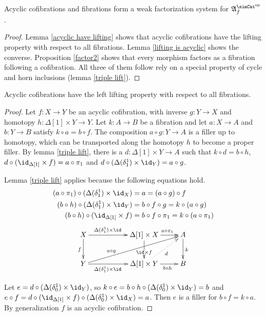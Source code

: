 \documentclass{tac}
\newcommand\hide[1]{}
\newcommand\dual{^{\mathrm{op}}}
\newcommand\s{^{\simCat\dual}}
\newcommand\of{:}
\newcommand\simplex\Delta
\newcommand\f{_f}
\newcommand\ambient{\mathfrak A}
\begin{document}
\begin{theorem} Acyclic cofibrations and fibrations form a weak factorization system for $\ambient\s\f$. \end{theorem}

\begin{proof} Lemma \ref{acyclic have lifting} shows that acyclic cofibrations have the lifting property with respect to all fibrations. Lemma \ref{lifting is acyclic} shows the converse. Proposition \ref{factor2} shows that every morphism factors as a fibration following a cofibration. All three of them follow rely on a special property of cycle and horn inclusions (lemma \ref{triple lift}).
\end{proof}

\hide{
to do: 
proof triple lift
proof that acyclic cofibrations have the required lifting properties

proof that every morphism with these lifting properties is an acyclic cofibration. 
proof factorization
}


\begin{lemma} Acyclic cofibrations have the left lifting property with respect to all fibrations. \label{acyclic have lifting}\end{lemma}

\begin{proof} Let $f\of X\to Y$ be an acyclic cofibration, with inverse $g\of Y\to X$ and homotopy $h\of\simplex[1]\times Y\to Y$. Let $k\of A\to B$ be a fibration and let $a\of X\to A$ and $b\of Y\to B$ satisfy $k\circ a=b\circ f$. The composition $a\circ g\of Y\to A$ is a filler up to homotopy, which can be transported along the homotopy $h$ to become a proper filler. By lemma \ref{triple lift}, there is a $d\of \simplex[1]\times Y\to A$ such that $k\circ d=b\circ h$, $d\circ (\id_{\simplex[1]}\times f)= a\circ \pi_1$ and $d\circ (\simplex(\delta^1_1)\times \id_Y) = a\circ g$. %

Lemma \ref{triple lift} applies because the following equations hold.
\begin{align*} 
	(a\circ \pi_1)\circ (\simplex(\delta^1_1)\times\id_X) &= a = (a\circ g)\circ f\\
	(b\circ h)\circ (\simplex(\delta^1_1)\times\id_Y) &= b\circ f\circ g = k\circ (a\circ g)\\
	(b\circ h)\circ (\id_{\simplex[1]}\times f) &= b\circ f\circ \pi_1 = k\circ (a\circ \pi_1)
\end{align*}
\[\xymatrix{
X\ar[d]_f \ar[rr]^(.4){\simplex(\delta^1_1)\times \id} && \simplex[1]\times X \ar[d]|(.6){\id\times f}\ar[r]^(.6){a\circ \pi_1} & A\ar[d]^k\\
Y \ar[rr]_(.4){\simplex(\delta^1_1)\times \id}\ar[urrr]^(.3){a\circ g} && \simplex[1]\times Y\ar[r]_(.6){b\circ h}\ar@{.>}[ur]_d & B
}\]

Let $e=d\circ(\simplex(\delta^1_0)\times \id_Y)$, so $k\circ e=b\circ h\circ (\simplex(\delta^1_0)\times \id_Y) = b$ and $e\circ f = d\circ (\id_{\simplex[1]}\times f)\circ (\simplex(\delta^1_0)\times \id_X) = a$. Then $e$ is a filler for $b\circ f=k\circ a$. By generalization $f$ is an acyclic cofibration.
\end{proof}
\end{document}
